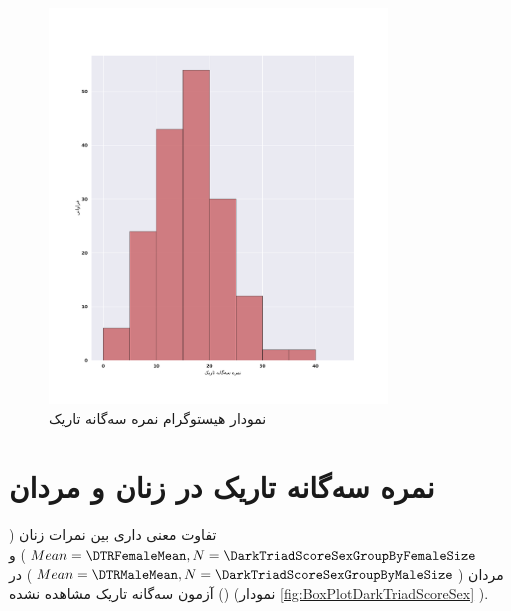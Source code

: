 \begin{figure}[htpb]
    \centering
    \includegraphics[width=0.8\textwidth]{./img/DTRHistogram.pdf}
    \caption{نمودار هیستوگرام نمره  سه‌گانه تاریک}
    \label{fig:DTRHistogram}
\end{figure}

\section{نمره سه‌گانه تاریک در زنان و مردان}
تفاوت معنی داری بین نمرات زنان
($Mean=\DTRFemaleMean,N=\DarkTriadScoreSexGroupByFemaleSize$)
و مردان
($Mean=\DTRMaleMean,N=\DarkTriadScoreSexGroupByMaleSize$)
در آزمون سه‌گانه تاریک مشاهده نشده
\!(\DarkTriadScoreSexIndTTestPValue)
\!(نمودار
\ref{fig:BoxPlotDarkTriadScoreSex}
).

